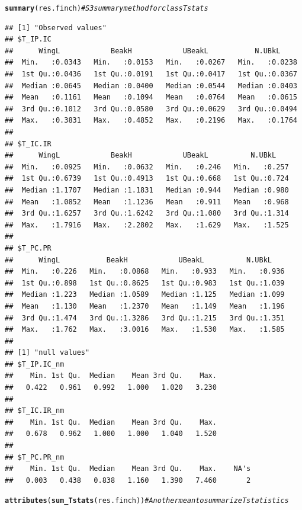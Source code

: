 \documentclass[12pt]{article}\usepackage[]{graphicx}\usepackage[]{color}
\makeatletter
\newcommand{\hlcom}[1]{\textcolor[rgb]{0.678,0.584,0.686}{\textit{#1}}}%
\newcommand{\hlstd}[1]{\textcolor[rgb]{0.345,0.345,0.345}{#1}}%
\newcommand{\hlkwd}[1]{\textcolor[rgb]{0.737,0.353,0.396}{\textbf{#1}}}%
\newenvironment{kframe}{%
 \def\at@end@of@kframe{}%
 \ifinner\ifhmode%
  \def\at@end@of@kframe{\end{minipage}}%
  \begin{minipage}{\columnwidth}%
 \fi\fi%
 \def\FrameCommand##1{\hskip\@totalleftmargin \hskip-\fboxsep
 \colorbox{shadecolor}{##1}\hskip-\fboxsep
     \hskip-\linewidth \hskip-\@totalleftmargin \hskip\columnwidth}%
 \MakeFramed {\advance\hsize-\width
   \@totalleftmargin\z@ \linewidth\hsize
   \@setminipage}}%
 {\par\unskip\endMakeFramed%
 \at@end@of@kframe}
\newenvironment{knitrout}{}{} %
\makeatother
\begin{document}
\begin{knitrout}
\color{fgcolor}\begin{kframe}
\begin{alltt}
\hlkwd{summary}\hlstd{(res.finch)} \hlcom{#S3 summary method for class Tstats}
\end{alltt}
\begin{verbatim}
## [1] "Observed values"
## $T_IP.IC
##      WingL            BeakH            UBeakL           N.UBkL      
##  Min.   :0.0343   Min.   :0.0153   Min.   :0.0267   Min.   :0.0238  
##  1st Qu.:0.0436   1st Qu.:0.0191   1st Qu.:0.0417   1st Qu.:0.0367  
##  Median :0.0645   Median :0.0400   Median :0.0544   Median :0.0403  
##  Mean   :0.1161   Mean   :0.1094   Mean   :0.0764   Mean   :0.0615  
##  3rd Qu.:0.1012   3rd Qu.:0.0580   3rd Qu.:0.0629   3rd Qu.:0.0494  
##  Max.   :0.3831   Max.   :0.4852   Max.   :0.2196   Max.   :0.1764  
## 
## $T_IC.IR
##      WingL            BeakH            UBeakL          N.UBkL     
##  Min.   :0.0925   Min.   :0.0632   Min.   :0.246   Min.   :0.257  
##  1st Qu.:0.6739   1st Qu.:0.4913   1st Qu.:0.668   1st Qu.:0.724  
##  Median :1.1707   Median :1.1831   Median :0.944   Median :0.980  
##  Mean   :1.0852   Mean   :1.1236   Mean   :0.911   Mean   :0.968  
##  3rd Qu.:1.6257   3rd Qu.:1.6242   3rd Qu.:1.080   3rd Qu.:1.314  
##  Max.   :1.7916   Max.   :2.2802   Max.   :1.629   Max.   :1.525  
## 
## $T_PC.PR
##      WingL           BeakH            UBeakL          N.UBkL     
##  Min.   :0.226   Min.   :0.0868   Min.   :0.933   Min.   :0.936  
##  1st Qu.:0.898   1st Qu.:0.8625   1st Qu.:0.983   1st Qu.:1.039  
##  Median :1.223   Median :1.0589   Median :1.125   Median :1.099  
##  Mean   :1.130   Mean   :1.2370   Mean   :1.149   Mean   :1.196  
##  3rd Qu.:1.474   3rd Qu.:1.3286   3rd Qu.:1.215   3rd Qu.:1.351  
##  Max.   :1.762   Max.   :3.0016   Max.   :1.530   Max.   :1.585  
## 
## [1] "null values"
## $T_IP.IC_nm
##    Min. 1st Qu.  Median    Mean 3rd Qu.    Max. 
##   0.422   0.961   0.992   1.000   1.020   3.230 
## 
## $T_IC.IR_nm
##    Min. 1st Qu.  Median    Mean 3rd Qu.    Max. 
##   0.678   0.962   1.000   1.000   1.040   1.520 
## 
## $T_PC.PR_nm
##    Min. 1st Qu.  Median    Mean 3rd Qu.    Max.    NA's 
##   0.003   0.438   0.838   1.160   1.390   7.460       2
\end{verbatim}
\begin{alltt}
\hlkwd{attributes}\hlstd{(}\hlkwd{sum_Tstats}\hlstd{(res.finch))} \hlcom{#An other mean to summarize Tstatistics}
\end{alltt}

\end{kframe}
\end{knitrout}
\end{document}
